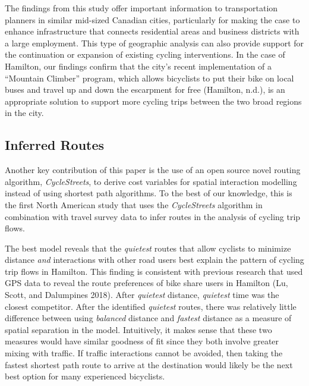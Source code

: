 \documentclass[smallextended]{svjour3}       %
\begin{document}
The findings from this study offer important information to
transportation planners in similar mid-sized Canadian cities,
particularly for making the case to enhance infrastructure that connects
residential areas and business districts with a large employment. This
type of geographic analysis can also provide support for the
continuation or expansion of existing cycling interventions. In the case
of Hamilton, our findings confirm that the city's recent implementation
of a ``Mountain Climber'' program, which allows bicyclists to put their
bike on local buses and travel up and down the escarpment for free
(Hamilton, n.d.), is an appropriate solution to support more cycling
trips between the two broad regions in the city.

\hypertarget{inferred-routes}{%
\subsection{Inferred Routes}\label{inferred-routes}}

Another key contribution of this paper is the use of an open source
novel routing algorithm, \emph{CycleStreets}, to derive cost variables
for spatial interaction modelling instead of using shortest path
algorithms. To the best of our knowledge, this is the first North
American study that uses the \emph{CycleStreets} algorithm in
combination with travel survey data to infer routes in the analysis of
cycling trip flows.

The best model reveals that the \emph{quietest} routes that allow
cyclists to minimize distance \emph{and} interactions with other road
users best explain the pattern of cycling trip flows in Hamilton. This
finding is consistent with previous research that used GPS data to
reveal the route preferences of bike share users in Hamilton (Lu, Scott,
and Dalumpines 2018). After \emph{quietest} distance, \emph{quietest}
time was the closest competitor. After the identified \emph{quietest}
routes, there was relatively little difference between using
\emph{balanced} distance and \emph{fastest} distance as a measure of
spatial separation in the model. Intuitively, it makes sense that these
two measures would have similar goodness of fit since they both involve
greater mixing with traffic. If traffic interactions cannot be avoided,
then taking the fastest shortest path route to arrive at the destination
would likely be the next best option for many experienced bicyclists.
\end{document}
